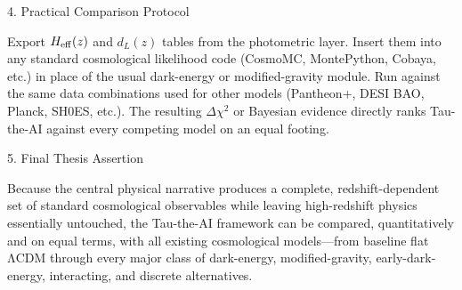 4. Practical Comparison Protocol

Export \(H_{\rm eff}(z)\) and \(d_L(z)\) tables from the photometric layer.  
Insert them into any standard cosmological likelihood code (CosmoMC, MontePython, Cobaya, etc.) in place of the usual dark-energy or modified-gravity module.  
Run against the same data combinations used for other models (Pantheon+, DESI BAO, Planck, SH0ES, etc.).  
The resulting \(\Delta\chi^2\) or Bayesian evidence directly ranks Tau-the-AI against every competing model on an equal footing.

5. Final Thesis Assertion

Because the central physical narrative produces a complete, redshift-dependent set of standard cosmological observables while leaving high-redshift physics essentially untouched, the Tau-the-AI framework can be compared, quantitatively and on equal terms, with all existing cosmological models—from baseline flat ΛCDM through every major class of dark-energy, modified-gravity, early-dark-energy, interacting, and discrete alternatives.
